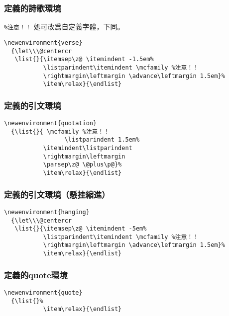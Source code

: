 \subsubsection{定義的詩歌環境}

\par \verb+%注意！！+ 処可改爲自定義字體，下同。
\begin{lstlisting}[firstnumber=1151]
\newenvironment{verse}
  {\let\\\@centercr
   \list{}{\itemsep\z@ \itemindent -1.5em%
           \listparindent\itemindent \mcfamily %注意！！
           \rightmargin\leftmargin \advance\leftmargin 1.5em}%
           \item\relax}{\endlist}
\end{lstlisting}

\subsubsection{定義的引文環境}

\begin{lstlisting}[firstnumber=1158]
\newenvironment{quotation}
  {\list{}{ \mcfamily %注意！！
  				 \listparindent 1.5em%
           \itemindent\listparindent
           \rightmargin\leftmargin
           \parsep\z@ \@plus\p@}%
           \item\relax}{\endlist}
\end{lstlisting}

\subsubsection{定義的引文環境（懸挂縮進）}

\begin{lstlisting}[firstnumber=1167]
\newenvironment{hanging}
  {\let\\\@centercr
   \list{}{\itemsep\z@ \itemindent -5em%
           \listparindent\itemindent \mcfamily %注意！！
           \rightmargin\leftmargin \advance\leftmargin 1.5em}%
           \item\relax}{\endlist}
\end{lstlisting}

\subsubsection{定義的quote環境}

\begin{lstlisting}[firstnumber=1174]
\newenvironment{quote}
  {\list{}%
           \item\relax}{\endlist}
\end{lstlisting}

